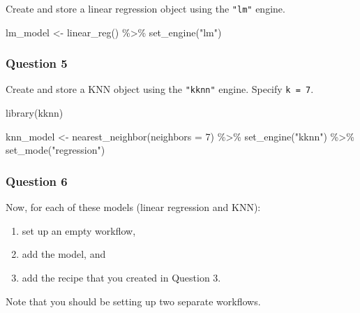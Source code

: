 \documentclass[
]{article}
\newenvironment{Shaded}{\begin{snugshade}}{\end{snugshade}}
\newcommand{\AttributeTok}[1]{\textcolor[rgb]{0.77,0.63,0.00}{#1}}
\newcommand{\DecValTok}[1]{\textcolor[rgb]{0.00,0.00,0.81}{#1}}
\newcommand{\FunctionTok}[1]{\textcolor[rgb]{0.00,0.00,0.00}{#1}}
\newcommand{\NormalTok}[1]{#1}
\newcommand{\OtherTok}[1]{\textcolor[rgb]{0.56,0.35,0.01}{#1}}
\newcommand{\SpecialCharTok}[1]{\textcolor[rgb]{0.00,0.00,0.00}{#1}}
\newcommand{\StringTok}[1]{\textcolor[rgb]{0.31,0.60,0.02}{#1}}
\providecommand{\tightlist}{%
  \setlength{\itemsep}{0pt}\setlength{\parskip}{0pt}}
\begin{document}
Create and store a linear regression object using the \texttt{"lm"}
engine.

\begin{Shaded}
\begin{Highlighting}[]
\NormalTok{lm\_model }\OtherTok{\textless{}{-}} \FunctionTok{linear\_reg}\NormalTok{() }\SpecialCharTok{\%\textgreater{}\%} 
  \FunctionTok{set\_engine}\NormalTok{(}\StringTok{"lm"}\NormalTok{)}
\end{Highlighting}
\end{Shaded}

\hypertarget{question-5}{%
\subsubsection{Question 5}\label{question-5}}

Create and store a KNN object using the \texttt{"kknn"} engine. Specify
\texttt{k\ =\ 7}.

\begin{Shaded}
\begin{Highlighting}[]
\FunctionTok{library}\NormalTok{(kknn)}

\NormalTok{knn\_model }\OtherTok{\textless{}{-}} \FunctionTok{nearest\_neighbor}\NormalTok{(}\AttributeTok{neighbors =} \DecValTok{7}\NormalTok{) }\SpecialCharTok{\%\textgreater{}\%} 
  \FunctionTok{set\_engine}\NormalTok{(}\StringTok{"kknn"}\NormalTok{) }\SpecialCharTok{\%\textgreater{}\%} 
  \FunctionTok{set\_mode}\NormalTok{(}\StringTok{"regression"}\NormalTok{)}
\end{Highlighting}
\end{Shaded}

\hypertarget{question-6}{%
\subsubsection{Question 6}\label{question-6}}

Now, for each of these models (linear regression and KNN):

\begin{enumerate}
\def\labelenumi{\arabic{enumi}.}
\tightlist
\item
  set up an empty workflow,
\item
  add the model, and
\item
  add the recipe that you created in Question 3.
\end{enumerate}

Note that you should be setting up two separate workflows.
\end{document}
